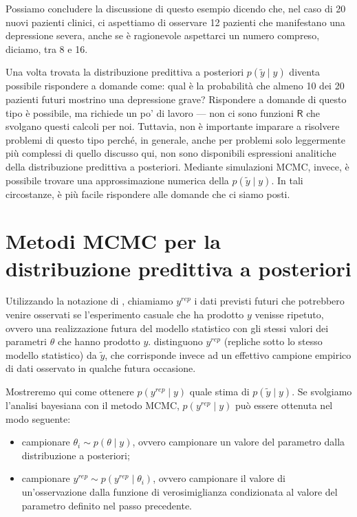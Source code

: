\documentclass[
]{memoir}
\providecommand{\tightlist}{%
  \setlength{\itemsep}{0pt}\setlength{\parskip}{0pt}}
\newcommand{\R}{\textsf{R}} %
\theoremstyle{definition}
\theoremstyle{definition}
\theoremstyle{definition}
\theoremstyle{definition}
\theoremstyle{remark}
\begin{document}
Possiamo concludere la discussione di questo esempio dicendo che, nel caso di 20 nuovi pazienti clinici, ci aspettiamo di osservare 12 pazienti che manifestano una depressione severa, anche se è ragionevole aspettarci un numero compreso, diciamo, tra 8 e 16.

Una volta trovata la distribuzione predittiva a posteriori \(p(\tilde{y} \mid y)\) diventa possibile rispondere a domande come: qual è la probabilità che almeno 10 dei 20 pazienti futuri mostrino una depressione grave? Rispondere a domande di questo tipo è possibile, ma richiede un po' di lavoro --- non ci sono funzioni \(\R\) che svolgano questi calcoli per noi. Tuttavia, non è importante imparare a risolvere problemi di questo tipo perché, in generale, anche per problemi solo leggermente più complessi di quello discusso qui, non sono disponibili espressioni analitiche della distribuzione predittiva a posteriori. Mediante simulazioni MCMC, invece, è possibile trovare una approssimazione numerica della \(p(\tilde{y} \mid y)\). In tali circostanze, è più facile rispondere alle domande che ci siamo posti.

\hypertarget{metodi-mcmc-per-la-distribuzione-predittiva-a-posteriori}{%
\section{Metodi MCMC per la distribuzione predittiva a posteriori}\label{metodi-mcmc-per-la-distribuzione-predittiva-a-posteriori}}

Utilizzando la notazione di \citet{gelman2014understanding}, chiamiamo \(y^{rep}\) i dati previsti futuri che potrebbero venire osservati se l'esperimento casuale che ha prodotto \(y\) venisse ripetuto, ovvero una realizzazione futura del modello statistico con gli stessi valori dei parametri \(\theta\) che hanno prodotto \(y\). \citet{gelman2014understanding} distinguono \(y^{rep}\) (repliche sotto lo stesso modello statistico) da \(\tilde{y}\), che corrisponde invece ad un effettivo campione empirico di dati osservato in qualche futura occasione.

Mostreremo qui come ottenere \(p(y^{rep} \mid y)\) quale stima di \(p(\tilde{y} \mid y)\). Se svolgiamo l'analisi bayesiana con il metodo MCMC, \(p(y^{rep} \mid y)\) può essere ottenuta nel modo seguente:

\begin{itemize}
\tightlist
\item
  campionare \(\theta_i \sim p(\theta \mid y)\), ovvero campionare un valore del parametro dalla distribuzione a posteriori;
\item
  campionare \(y^{rep} \sim p(y^{rep} \mid \theta_i)\), ovvero campionare il valore di un'osservazione dalla funzione di verosimiglianza condizionata al valore del parametro definito nel passo precedente.
\end{itemize}
\end{document}
